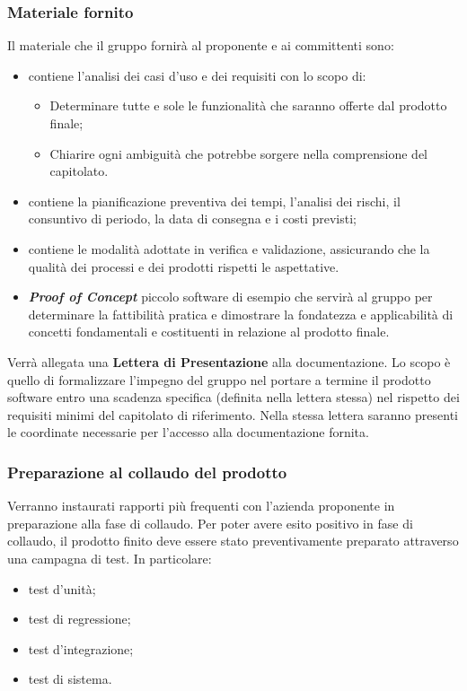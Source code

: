 \subsubsection{Materiale fornito}
Il materiale che il gruppo fornirà al proponente e ai committenti sono:
\begin{itemize}
  \item \textbf{\AdR} contiene l’analisi dei casi d’uso e dei requisiti con lo scopo di: 
	\begin{itemize}
		\item Determinare tutte e sole le funzionalità che saranno offerte dal prodotto finale;
		\item Chiarire ogni ambiguità che potrebbe sorgere nella comprensione del capitolato.
	\end{itemize}  

  \item \textbf{\PdP} contiene la pianificazione preventiva dei tempi, l’analisi dei rischi, il consuntivo di periodo, la data di consegna e i costi previsti;

  \item \textbf{\PdQ} contiene le modalità adottate in verifica e validazione, assicurando che la qualità dei processi e dei prodotti rispetti le aspettative.
  
  \item \textit{\textbf{Proof of Concept}} piccolo software di esempio che servirà al gruppo per determinare la fattibilità pratica e dimostrare la fondatezza e applicabilità di concetti fondamentali e costituenti in relazione al prodotto finale. 

\end{itemize}

Verrà allegata una \textbf{Lettera di Presentazione} alla documentazione. Lo scopo è quello di formalizzare l'impegno del gruppo nel portare a termine il prodotto software entro una scadenza specifica (definita nella lettera stessa) nel rispetto dei requisiti minimi del capitolato di riferimento. Nella stessa lettera saranno presenti le coordinate necessarie per l'accesso alla documentazione fornita.

\subsubsection{Preparazione al collaudo del prodotto}
Verranno instaurati rapporti più frequenti con l'azienda proponente in preparazione alla fase di collaudo.
Per poter avere esito positivo in fase di collaudo, il prodotto finito deve essere stato preventivamente preparato attraverso una campagna di test. In particolare:
\begin{itemize}
\item test d’unità;
\item test di regressione;
\item test d’integrazione;
\item test di sistema.
\end{itemize}

